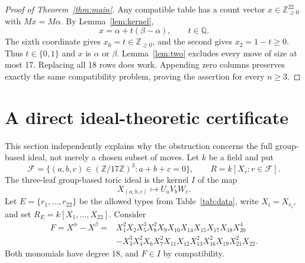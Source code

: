 \documentclass[11pt,a4paper]{article}
\newcommand{\ZZ}{\mathbb Z}
\newcommand{\QQ}{\mathbb Q}
\newcommand{\NN}{\mathbb Z_{\geq0}}
\begin{document}
\begin{proof}[Proof of Theorem~\ref{thm:main}]
Any compatible table has a count vector $x\in\NN^{22}$ with
$Mx=M\alpha$. By Lemma~\ref{lem:kernel},
\[
 x=\alpha+t(\beta-\alpha),\qquad t\in\QQ.
\]
The sixth coordinate gives $x_6=t\in\NN$, and the second gives
$x_2=1-t\geq0$. Thus $t\in\{0,1\}$ and $x$ is $\alpha$ or $\beta$.
Lemma~\ref{lem:two} excludes every move of size at most 17. Replacing all
18 rows does work. Appending zero columns preserves exactly the same
compatibility problem, proving the assertion for every $n\geq3$.
\end{proof}

\clearpage
\section{A direct ideal-theoretic certificate}
This section independently explains why the obstruction concerns the
full group-based ideal, not merely a chosen subset of moves.
Let $k$ be a field and put
\[
 \mathcal F=\{(a,b,c)\in(\ZZ/17\ZZ)^3:a+b+c=0\},\qquad
 R=k[X_r:r\in\mathcal F].
\]
The three-leaf group-based toric ideal is the kernel $I$ of the map
\[
 X_{(a,b,c)}\longmapsto U_aV_bW_c.
\]
Let $E=\{r_1,\ldots,r_{22}\}$ be the allowed types from Table~\ref{tab:data},
write $X_i=X_{r_i}$, and set $R_E=k[X_1,\ldots,X_{22}]$.
Consider
\begin{align*}
 F=X^\alpha-X^\beta
   ={}&X_1^2X_2X_5^3X_8^2X_9X_{10}X_{14}X_{15}X_{17}X_{18}X_{20}^4\\
     &-X_3^3X_4^2X_6X_7^2X_{11}X_{12}X_{13}^2X_{16}^2X_{19}X_{21}^2X_{22}.
\end{align*}
Both monomials have degree 18, and $F\in I$ by compatibility.
\end{document}
